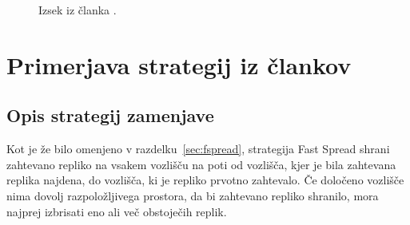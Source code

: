\documentclass[a4paper, 12pt]{book}
\begin{document}
\begin{figure}
  \begin{center}
  \end{center}
  \caption{Izsek iz članka \cite{mfs2012}.}
  \label{pic2012}
\end{figure}



\chapter{Primerjava strategij iz člankov}

\section{Opis strategij zamenjave}
Kot je že bilo omenjeno v razdelku~\ref{sec:fspread}, strategija Fast Spread
shrani zahtevano repliko na vsakem vozlišču na poti od vozlišča, kjer je
bila zahtevana replika najdena, do vozlišča, ki je repliko prvotno
zahtevalo. Če določeno vozlišče nima dovolj razpoložljivega prostora,
da bi zahtevano repliko shranilo, mora najprej izbrisati eno ali več
obstoječih replik.
\end{document}
